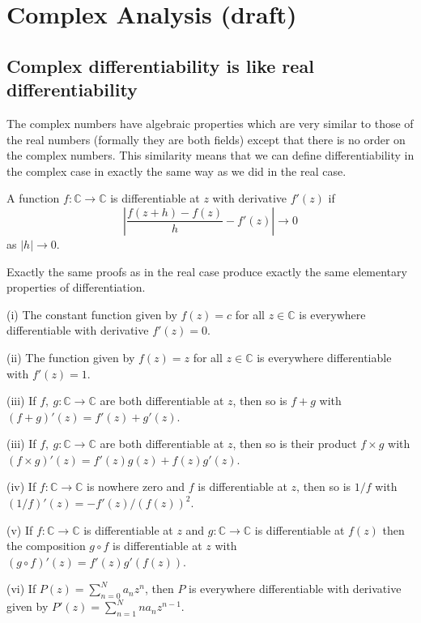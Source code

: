 \chapter{Complex Analysis (draft)}

\section{Complex differentiability is like real differentiability}%
\label{S Algebra}
The complex numbers
have algebraic properties which are very similar to
those of the real numbers (formally they are both fields)
except that there is no order on the complex numbers.
This similarity means that we can define differentiability
in the complex case in exactly the same way as we
did in the real case.
\begin{definition} A function $f:{\mathbb C}\rightarrow{\mathbb C}$
is differentiable at $z$ with derivative $f'(z)$ if 
\[\left|\frac{f(z+h)-f(z)}{h}-f'(z)\right|\rightarrow 0\]
as $|h|\rightarrow 0$.
\end{definition}
Exactly the same proofs as in the real case produce
exactly the same elementary properties of differentiation.
\begin{lemma}\label{L Easy differentiation}
(i) The constant function given by $f(z)=c$ for all $z\in{\mathbb C}$
is everywhere differentiable with derivative $f'(z)=0$.

(ii) The function given by $f(z)=z$ for all $z\in{\mathbb C}$
is everywhere differentiable with $f'(z)=1$.

(iii) If $f,\ g:{\mathbb C}\rightarrow{\mathbb C}$ are 
both differentiable at $z$, then so is $f+g$ with
$(f+g)'(z)=f'(z)+g'(z)$.

(iii) If $f,\ g:{\mathbb C}\rightarrow{\mathbb C}$ are 
both differentiable at $z$, then so is their product $f\times g$ with
$(f\times g)'(z)=f'(z)g(z)+f(z)g'(z)$.

(iv) If $f:{\mathbb C}\rightarrow{\mathbb C}$ is nowhere zero
and $f$ is differentiable at $z$, then so is $1/f$ with
$(1/f)'(z)=-f'(z)/(f(z))^{2}$.

(v) If $f:{\mathbb C}\rightarrow{\mathbb C}$ is
differentiable at $z$ and $g:{\mathbb C}\rightarrow{\mathbb C}$
is differentiable at $f(z)$ then the composition
$g\circ f$ is differentiable at $z$ with
$(g\circ f)'(z)=f'(z)g'(f(z))$.

(vi) If $P(z)=\sum_{n=0}^{N}a_{n}z^{n}$, then $P$ is everywhere
differentiable with derivative given by
$P'(z)=\sum_{n=1}^{N}na_{n}z^{n-1}$.
\end{lemma}
